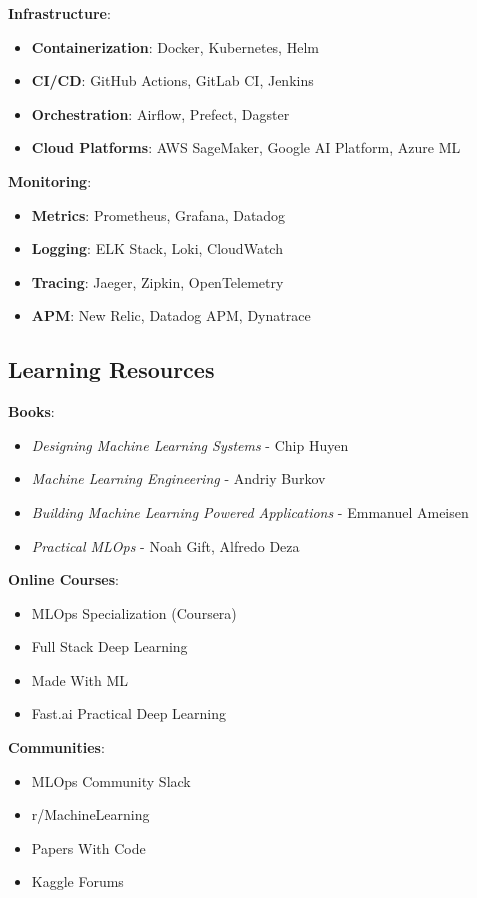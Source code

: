 \textbf{Infrastructure}:
\begin{itemize}
    \item \textbf{Containerization}: Docker, Kubernetes, Helm
    \item \textbf{CI/CD}: GitHub Actions, GitLab CI, Jenkins
    \item \textbf{Orchestration}: Airflow, Prefect, Dagster
    \item \textbf{Cloud Platforms}: AWS SageMaker, Google AI Platform, Azure ML
\end{itemize}

\textbf{Monitoring}:
\begin{itemize}
    \item \textbf{Metrics}: Prometheus, Grafana, Datadog
    \item \textbf{Logging}: ELK Stack, Loki, CloudWatch
    \item \textbf{Tracing}: Jaeger, Zipkin, OpenTelemetry
    \item \textbf{APM}: New Relic, Datadog APM, Dynatrace
\end{itemize}

\subsection{Learning Resources}

\textbf{Books}:
\begin{itemize}
    \item \emph{Designing Machine Learning Systems} - Chip Huyen
    \item \emph{Machine Learning Engineering} - Andriy Burkov
    \item \emph{Building Machine Learning Powered Applications} - Emmanuel Ameisen
    \item \emph{Practical MLOps} - Noah Gift, Alfredo Deza
\end{itemize}

\textbf{Online Courses}:
\begin{itemize}
    \item MLOps Specialization (Coursera)
    \item Full Stack Deep Learning
    \item Made With ML
    \item Fast.ai Practical Deep Learning
\end{itemize}

\textbf{Communities}:
\begin{itemize}
    \item MLOps Community Slack
    \item r/MachineLearning
    \item Papers With Code
    \item Kaggle Forums
\end{itemize}

